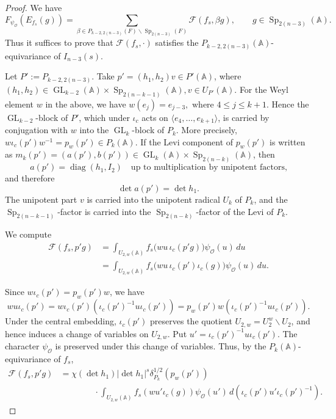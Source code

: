 \documentclass[11pt,notitlepage]{amsart}
\theoremstyle{definition}
\theoremstyle{remark}
\newcommand{\calF}{\mathcal{F}}
\newcommand{\calO}{\mathcal{O}}
\newcommand{\bbA}{\mathbb{A}}
\DeclareMathOperator{\GL}{GL}
\DeclareMathOperator{\Sp}{Sp}
\DeclareMathOperator{\diag}{diag}
\begin{document}
\begin{proof}
We have
\[
  F_{\psi_\calO}(E_{f_s}(g))
  =
  \sum_{\beta \in P_{k-2,2(n-3)}(F)\backslash \Sp_{2(n-3)}(F)}
  \calF(f_s,\beta g),
  \qquad g\in \Sp_{2(n-3)}(\bbA).
\]
Thus it suffices to prove that \(\calF(f_s,\cdot)\) satisfies the
\(P_{k-2,2(n-3)}(\bbA)\)-equivariance of \(I_{n-3}(s)\).

Let  $P' := P_{k-2,2(n-3)}$. Take $p'=(h_1,h_2)v\in P'(\bbA)$, where
  $(h_1,h_2)\in
  \GL_{k-2}(\bbA)\times \Sp_{2(n-k-1)}(\bbA),
  v\in U_{P'}(\bbA)$. For the Weyl element \(w\) in the above, we have $w(e_j)=e_{j-3},\text{ where } 4\leq j\leq k+1$. Hence the \(\GL_{k-2}\)-block of \(P'\), which under
\(\iota_{c}\) acts on $\langle e_4,\ldots,e_{k+1}\rangle$, is carried by conjugation with \(w\) into the \(\GL_k\)-block of \(P_k\). More
precisely,
  $w\iota_c(p')w^{-1}
  =
  p_w(p')\in P_k(\bbA)$. If the Levi component of \(p_w(p')\) is written as $m_k(p')=(a(p'),b(p'))\in
  \GL_k(\bbA)\times \Sp_{2(n-k)}(\bbA)$, then
\[
  a(p')=\diag(h_1,I_2)
  \quad\text{up to multiplication by unipotent factors,}
\]
and therefore \begin{equation}\label{eq:det-pw-triv}
  \det a(p')=\det h_1.
\end{equation} The unipotent part \(v\) is carried into the unipotent radical \(U_k\) of
\(P_k\), and the \(\Sp_{2(n-k-1)}\)-factor is carried into the
\(\Sp_{2(n-k)}\)-factor of the Levi of \(P_k\).

We compute
\[
\begin{aligned}
  \calF(f_s,p'g)
  &=
  \int_{U_{2,w}(\bbA)}
    f_s\!\bigl(wu\,\iota_{c}(p'g)\bigr)\psi_\calO(u)\,du  \\
  &=
  \int_{U_{2,w}(\bbA)}
    f_s\!\bigl(wu\,\iota_{c}(p')\iota_{c}(g)\bigr)
    \psi_\calO(u)\,du.
\end{aligned}
\]

Since $w\iota_{c}(p')=p_w(p')w$, we have
\[
  wu\iota_{c}(p')
  =
  w\iota_{c}(p')
  \left(\iota_{c}(p')^{-1}u\iota_{c}(p')\right)
  =
  p_w(p')w
  \left(\iota_{c}(p')^{-1}u\iota_{c}(p')\right).
\]
Under the central embedding, \(\iota_{c}(p')\) preserves the quotient $U_{2,w}=U_2^w\backslash U_2$, and hence induces a change of variables on \(U_{2,w}\). Put 
  $u'=\iota_{c}(p')^{-1}u\iota_{c}(p')$. The character \(\psi_\calO\) is preserved under this change of variables. Thus,
by the \(P_k(\bbA)\)-equivariance of \(f_s\),
\[
\begin{aligned}
  \calF(f_s,p'g)
  &=
  \chi(\det h_1)|\det h_1|^s
  \delta_{P_k}^{1/2}(p_w(p'))  \\
  &\qquad\qquad\cdot
  \int_{U_{2,w}(\bbA)}
    f_s(wu'\iota_{c}(g))\psi_\calO(u')\,
    d\!\left(\iota_{c}(p')u'\iota_{c}(p')^{-1}\right).
\end{aligned}
\]


\end{proof}
\end{document}
